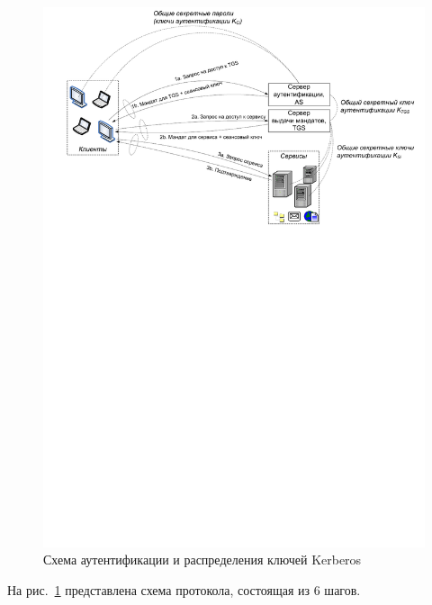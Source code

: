 \begin{figure}[!ht]
	\centering
	\includegraphics[width=\textwidth]{pic/kerberos}
	\caption{Схема аутентификации и распределения ключей Kerberos\label{fig:kerberos}}
\end{figure}

На рис.~\ref{fig:kerberos} представлена схема протокола, состоящая из 6 шагов.

